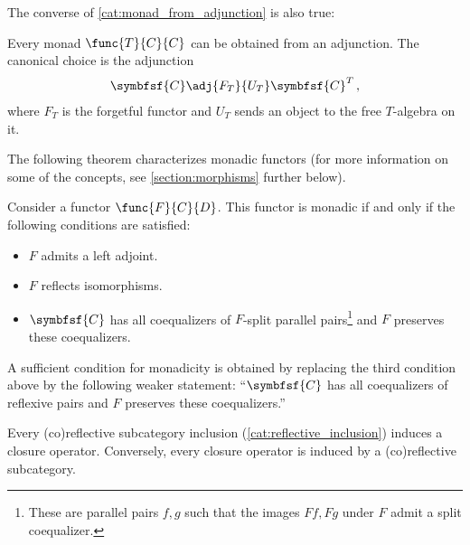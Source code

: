     The converse of \ref{cat:monad_from_adjunction} is also true:
    \begin{property}
        Every monad $\func{T}{C}{C}$ can be obtained from an adjunction. The canonical choice is the adjunction
        \begin{gather}
            \symbfsf{C}\adj{F_T}{U_T}\symbfsf{C}^T\,,
        \end{gather}
        where $F_T$ is the forgetful functor and $U_T$ sends an object to the free $T$-algebra on it.
    \end{property}

    The following theorem characterizes monadic functors (for more information on some of the concepts, see \cref{section:morphisms} further below).
    \begin{theorem}
        Consider a functor $\func{F}{C}{D}$. This functor is monadic if and only if the following conditions are satisfied:
        \begin{itemize}
            \item $F$ admits a left adjoint.
            \item $F$ reflects isomorphisms.
            \item $\symbfsf{C}$ has all coequalizers of $F$-split parallel pairs\footnote{These are parallel pairs $f,g$ such that the images $Ff,Fg$ under $F$ admit a split coequalizer.} and $F$ preserves these coequalizers.
        \end{itemize}
    \end{theorem}
    \begin{remark}
        A sufficient condition for monadicity is obtained by replacing the third condition above by the following weaker statement: ``$\symbfsf{C}$ has all coequalizers of reflexive pairs and $F$ preserves these coequalizers.''
    \end{remark}

    \begin{property}
        Every (co)reflective subcategory inclusion (\cref{cat:reflective_inclusion}) induces a closure operator. Conversely, every closure operator is induced by a (co)reflective subcategory.
    \end{property}

